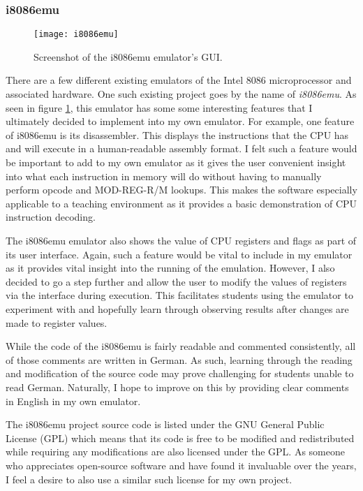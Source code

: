     \subsubsection{i8086emu}
        \begin{figure}[ht]
            \centering
            \texttt{[image: i8086emu]}
            \caption{Screenshot of the i8086emu emulator's GUI.}
            \label{fig:i8086emu}
        \end{figure}

        There are a few different existing emulators of the Intel 8086 microprocessor and associated hardware. One such existing project goes by the name of \textit{i8086emu}. As seen in figure \ref{fig:i8086emu}, this emulator has some some interesting features that I ultimately decided to implement into my own emulator. For example, one feature of i8086emu is its disassembler. This displays the instructions that the CPU has and will execute in a human-readable assembly format. I felt such a feature would be important to add to my own emulator as it gives the user convenient insight into what each instruction in memory will do without having to manually perform opcode and MOD-REG-R/M lookups. This makes the software especially applicable to a teaching environment as it provides a basic demonstration of CPU instruction decoding.

        The i8086emu emulator also shows the value of CPU registers and flags as part of its user interface. Again, such a feature would be vital to include in my emulator as it provides vital insight into the running of the emulation. However, I also decided to go a step further and allow the user to modify the values of registers via the interface during execution. This facilitates students using the emulator to experiment with and hopefully learn through observing results after changes are made to register values.

        While the code of the i8086emu is fairly readable and commented consistently, all of those comments are written in German. As such, learning through the reading and modification of the source code may prove challenging for students unable to read German. Naturally, I hope to improve on this by providing clear comments in English in my own emulator.

        The i8086emu project source code is listed under the GNU General Public License (GPL) which means that its code is free to be modified and redistributed while requiring any modifications are also licensed under the GPL. As someone who appreciates open-source software and have found it invaluable over the years, I feel a desire to also use a similar such license for my own project.

